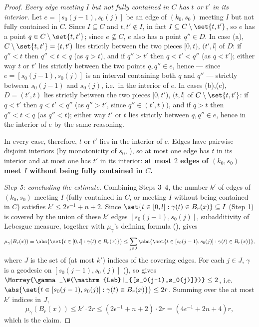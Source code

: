\begin{proof}
  \emph{Every edge meeting $I$ but not fully contained in $C$ has $t$ or $t'$ in its interior.} Let
  $e=[s_0(j-1),s_0(j)]$ be an edge of $(k_0,s_0)$ meeting $I$ but not fully contained in $C$. Since
  $I\subseteq C$ and $t,t'\notin I$, in fact $I\subseteq C\setminus\set{t,t'}$, so $e$ has a point
  $q\in C\setminus\set{t,t'}$; since $e\not\subseteq C$, $e$ also has a point $q''\in D$. In case
  (a), $C\setminus\set{t,t'}=(t,t')$ lies strictly between the two pieces $[0,t)$, $(t',l]$ of $D$:
  if $q''<t$ then $q''<t<q$ (as $q>t$), and if $q''>t'$ then $q<t'<q''$ (as $q<t'$); either way $t$
  or $t'$ lies strictly between the two points $q,q''\in e$, hence — since $e=[s_0(j-1),s_0(j)]$ is
  an interval containing both $q$ and $q''$ — strictly between $s_0(j-1)$ and $s_0(j)$, i.e.\ in
  the interior of $e$. In cases (b),(c), $D=(t',t)$ lies strictly between the two pieces $[0,t')$,
  $(t,l]$ of $C\setminus\set{t,t'}$: if $q<t'$ then $q<t'<q''$ (as $q''>t'$, since $q''\in(t',t)$),
  and if $q>t$ then $q''<t<q$ (as $q''<t$); either way $t'$ or $t$ lies strictly between $q,q''\in
  e$, hence in the interior of $e$ by the same reasoning.

  In every case, therefore, $t$ or $t'$ lies in the interior of $e$. Edges have pairwise disjoint
  interiors (by monotonicity of $s_0$, ), so at most one edge has $t$
  in its interior and at most one has $t'$ in its interior: \textbf{at most $2$ edges of
  $(k_0,s_0)$ meet $I$ without being fully contained in $C$.}

  \emph{Step 5: concluding the estimate.} Combining Steps 3--4, the number $k'$ of edges of
  $(k_0,s_0)$ meeting $I$ (fully contained in $C$, or meeting $I$ without being contained in $C$)
  satisfies $k' \leq 2\epsilon^{-1}+n+2$. Since $\set{t\in[0,l]:\gamma(t)\in B_r(x)} \subseteq I$
  (Step 1) is covered by the union of these $k'$ edges $[s_0(j-1),s_0(j)]$, subadditivity of
  Lebesgue measure, together with $\mu_\gamma$'s defining formula (), gives
  \[
    \mu_\gamma(B_r(x)) = \abs{\set{t\in[0,l]:\gamma(t)\in B_r(x)}}
    \leq \sum_{j \in J} \abs{\set{t \in [s_0(j-1),s_0(j)] : \gamma(t) \in B_r(x)}}
    ,
  \]
  where $J$ is the set of (at most $k'$) indices of the covering edges. For each $j \in J$,
  $\gamma$ is a geodesic on $[s_0(j-1),s_0(j)]$ (), so
   gives $\Morrey{\gamma_\#(\mathrm{Leb}|_{[s_0(j-1),s_0(j)]})} \leq 2$,
  i.e.\ $\abs{\set{t \in [s_0(j-1),s_0(j)] : \gamma(t) \in B_r(x)}} \leq 2r$. Summing over the at
  most $k'$ indices in $J$,
  \[
    \mu_\gamma(B_r(x)) \leq k' \cdot 2r \leq (2\epsilon^{-1}+n+2)\cdot 2r = (4\epsilon^{-1}+2n+4) r
    ,
  \]
  which is the claim. \qedhere
\end{proof}
